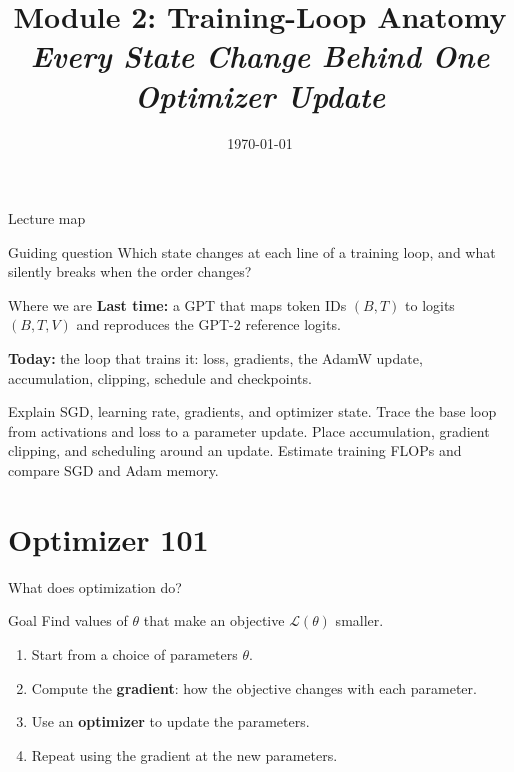 \documentclass[handout]{beamer}
\title[TASLLM -- Module 2]{Module 2: Training-Loop Anatomy\\[4pt]
\normalsize\itshape Every State Change Behind One Optimizer Update}
\date{\today}
\begin{document}
\makelecturetitle

\begin{frame}{Lecture map}
  \tableofcontents
  \vfill
  \begin{block}{Guiding question}
    Which state changes at each line of a training loop, and what silently breaks when the order changes?
  \end{block}
\end{frame}

\begin{frame}{Where we are}
  \vspace{10pt}
  \textbf{\textcolor{accentdark}{Last time:}} a GPT that maps token IDs $(B,T)$ to logits $(B,T,V)$ and reproduces the GPT-2 reference logits.\par
  \vspace{10pt}
  \textbf{\textcolor{signaldark}{Today:}} the loop that trains it: loss, gradients, the AdamW update, accumulation, clipping, schedule and checkpoints.
\end{frame}

\learninggoals
{Explain SGD, learning rate, gradients, and optimizer state.}
{Trace the base loop from activations and loss to a parameter update.}
{Place accumulation, gradient clipping, and scheduling around an update.}
{Estimate training FLOPs and compare SGD and Adam memory.}

\section{Optimizer 101}

\begin{frame}{What does optimization do?}
  \begin{block}{Goal}
    Find values of $\theta$ that make an objective $\mathcal L(\theta)$ smaller.
  \end{block}
  \begin{enumerate}
      \setlength{\itemsep}{7pt}
    \item Start from a choice of parameters $\theta$.
    \item Compute the \textbf{gradient}: how the objective changes with each parameter.
    \item Use an \textbf{optimizer} to update the parameters.
    \item Repeat using the gradient at the new parameters.
  \end{enumerate}
\end{frame}
\end{document}
